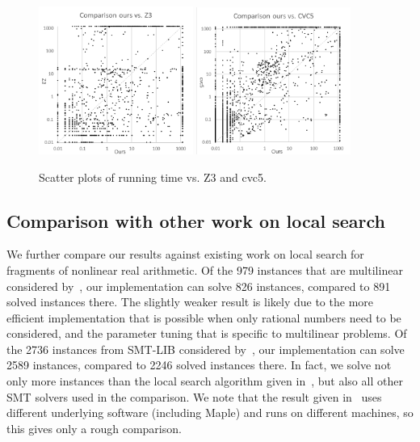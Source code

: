 \documentclass[runningheads]{llncs}
\begin{document}
\begin{figure}
    \centering
    \includegraphics[width=0.45\textwidth]{scatter_z3b.png}\qquad
    \includegraphics[width=0.45\textwidth]{scatter_cvc5b.png}
    \caption{Scatter plots of running time vs. Z3 and cvc5.}
    \label{fig:scatter_plots}
\end{figure}

\subsection{Comparison with other work on local search}

We further compare our results against existing work on local search for fragments of nonlinear real arithmetic. Of the 979 instances that are multilinear considered by~\cite{abs-2303-06676}, our implementation can solve 826 instances, compared to 891 solved instances there. The slightly weaker result is likely due to the more efficient implementation that is possible when only rational numbers need to be considered, and the parameter tuning that is specific to multilinear problems. Of the 2736 instances from SMT-LIB considered by~\cite{LiXZ23}, our implementation can solve 2589 instances, compared to 2246 solved instances there. In fact, we solve not only more instances than the local search algorithm given in~\cite{LiXZ23}, but also all other SMT solvers used in the comparison. We note that the result given in~\cite{LiXZ23} uses different underlying software (including Maple) and runs on different machines, so this gives only a rough comparison.
\end{document}
